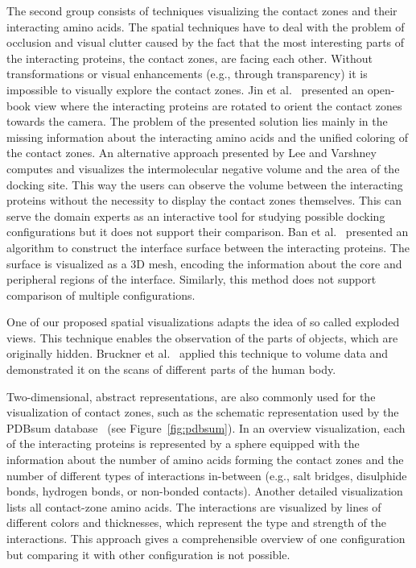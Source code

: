 \documentclass{bmcart}
\begin{document}
The second group consists of techniques visualizing the contact zones and their interacting amino acids.
The spatial techniques have to deal with the problem of occlusion and visual clutter caused by the fact that the most interesting parts of the interacting proteins, the contact zones, are facing each other.
Without transformations or visual enhancements (e.g., through transparency) it is impossible to visually explore the contact zones.
Jin et al.~\cite{Jin2014} presented an open-book view where the interacting proteins are rotated to orient the contact zones towards the camera.
The problem of the presented solution lies mainly in the missing information about the interacting amino acids and the unified coloring of the contact zones.
An alternative approach presented by Lee and Varshney~\cite{Varshney2003} computes and visualizes the intermolecular negative volume and the area of the docking site. %
This way the users can observe the volume between the interacting proteins without the necessity to display the contact zones themselves.
This can serve the domain experts as an interactive tool for studying possible docking configurations but it does not support their comparison.
Ban et al.~\cite{Ban2006} presented an algorithm to construct the interface surface between the interacting proteins.
The surface is visualized as a 3D mesh, encoding the information about the core and peripheral regions of the interface. 
Similarly, this method does not support comparison of multiple configurations.

One of our proposed spatial visualizations adapts the idea of so called exploded views.
This technique enables the observation of the parts of objects, which are originally hidden.
Bruckner et al.~\cite{Bruckner2006} applied this technique to volume data and demonstrated it on the scans of different parts of the human body.

Two-dimensional, abstract representations, are also commonly used for the visualization of contact zones, such as the schematic representation used by the PDBsum database~\cite{pdbsum} (see Figure~\ref{fig:pdbsum}).
In an overview visualization, each of the interacting proteins is represented by a sphere equipped with the information about the number of amino acids forming the contact zones and the number of different types of interactions in-between (e.g., salt bridges, disulphide bonds, hydrogen bonds, or non-bonded contacts).
Another detailed visualization lists all contact-zone amino acids. 
The interactions are visualized by lines of different colors and thicknesses, which represent the type and strength of the interactions. 
This approach gives a comprehensible overview of one configuration but comparing it with other configuration is not possible.
\end{document}
